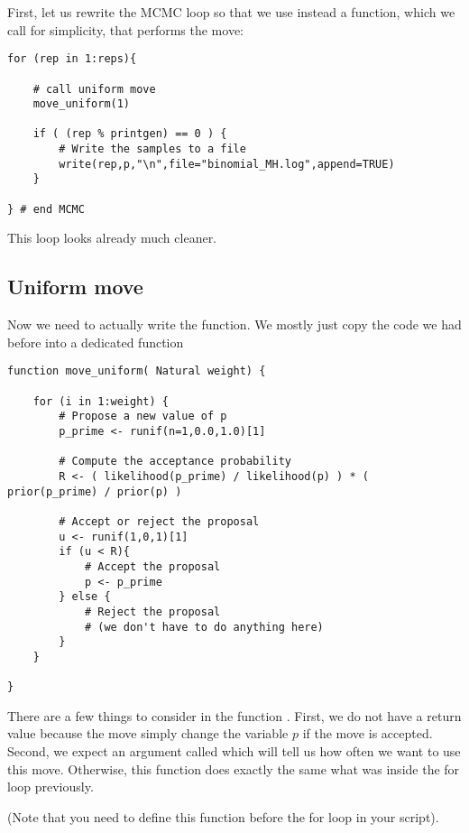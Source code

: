 First, let us rewrite the MCMC loop so that we use instead a function, which we call  for simplicity, that performs the move:
{\tt \begin{snugshade*}
\begin{lstlisting}    
for (rep in 1:reps){
    
    # call uniform move
    move_uniform(1)
    
    if ( (rep % printgen) == 0 ) {
        # Write the samples to a file
        write(rep,p,"\n",file="binomial_MH.log",append=TRUE)
    }

} # end MCMC
\end{lstlisting}
\end{snugshade*}}
This loop looks already much cleaner.

\subsection{Uniform move}
Now we need to actually write the  function.
We mostly just copy the code we had before into a dedicated function
{\tt \begin{snugshade*}
\begin{lstlisting}    
function move_uniform( Natural weight) {

    for (i in 1:weight) {
        # Propose a new value of p
        p_prime <- runif(n=1,0.0,1.0)[1]

        # Compute the acceptance probability
        R <- ( likelihood(p_prime) / likelihood(p) ) * ( prior(p_prime) / prior(p) )
    
        # Accept or reject the proposal
        u <- runif(1,0,1)[1]
        if (u < R){
            # Accept the proposal
            p <- p_prime
        } else {
            # Reject the proposal
            # (we don't have to do anything here)
        }
    }
    
}
\end{lstlisting}
\end{snugshade*}}
There are a few things to consider in the function .
First, we do not have a return value because the move simply change the variable $p$ if the move is accepted.
Second, we expect an argument called  which will tell us how often we want to use this move.
Otherwise, this function does exactly the same what was inside the for loop previously.

(Note that you need to define this function before the for loop in your script).



